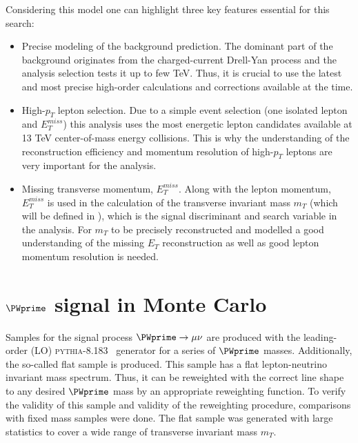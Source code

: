Considering this model one can highlight three key features essential for this search:
\begin{itemize}
 \item Precise modeling of the background prediction. 
 The dominant part of the background originates from the charged-current Drell-Yan process and the analysis selection tests it up to few TeV.
 Thus, it is crucial to use the latest and most precise high-order calculations and corrections available at the time.
 \item High-$p_T$ lepton selection. Due to a simple event selection (one isolated lepton and $E_T^{miss}$) 
 this analysis uses the most energetic lepton candidates available at 13 TeV center-of-mass energy collisions.
 This is why the understanding of the reconstruction efficiency and momentum resolution of high-$p_T$ leptons are very important for the analysis.
 \item Missing transverse momentum, $E_T^{miss}$. Along with the lepton momentum, $E_T^{miss}$ is used in the calculation of the transverse invariant mass $m_T$ (which will be defined in ),
 which is the signal discriminant and search variable in the analysis. For $m_T$ to be precisely reconstructed and modelled a good understanding of the missing $E_T$ reconstruction as well as good lepton momentum resolution is needed.
\end{itemize}

\section{$\PWprime$ signal in Monte Carlo}
\label{sec:wprimeSignal} 

% 

Samples for the signal process $\PWprime \to \mu \nu$ are produced with the leading-order (LO) 
{\scshape pythia-8.183}~\cite{pythia8} generator for a series of $\PWprime$ masses. 
Additionally, the so-called flat sample is produced. This sample has a flat lepton-neutrino invariant mass spectrum.
Thus, it can be reweighted with the correct line shape to any desired $\PWprime$ mass by an appropriate reweighting function.
To verify the validity of this sample and validity of the reweighting procedure, comparisons with fixed mass samples were done.
The flat sample was generated with large statistics to cover
a wide range of transverse invariant mass $m_T$.

